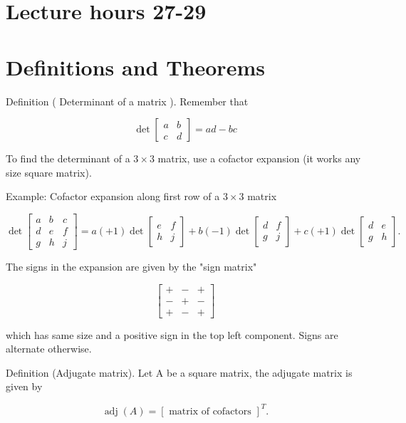 \documentclass[10pt]{article}
\begin{document}
\section*{Lecture hours 27-29}
\section*{Definitions and Theorems}
Definition ( Determinant of a matrix ). Remember that

$$
\operatorname{det}\left[\begin{array}{ll}
a & b \\
c & d
\end{array}\right]=a d-b c
$$

To find the determinant of a $3 \times 3$ matrix, use a cofactor expansion (it works any size square matrix).

Example: Cofactor expansion along first row of a $3 \times 3$ matrix

$$
\operatorname{det}\left[\begin{array}{lll}
a & b & c \\
d & e & f \\
g & h & j
\end{array}\right]=a(+1) \operatorname{det}\left[\begin{array}{ll}
e & f \\
h & j
\end{array}\right]+b(-1) \operatorname{det}\left[\begin{array}{ll}
d & f \\
g & j
\end{array}\right]+c(+1) \operatorname{det}\left[\begin{array}{ll}
d & e \\
g & h
\end{array}\right] .
$$

The signs in the expansion are given by the "sign matrix"

$$
\left[\begin{array}{ccc}
+ & - & + \\
- & + & - \\
+ & - & +
\end{array}\right]
$$

which has same size and a positive sign in the top left component. Signs are alternate otherwise.

Definition (Adjugate matrix). Let A be a square matrix, the adjugate matrix is given by

$$
\operatorname{adj}(A)=[\text { matrix of cofactors }]^{T} .
$$
\end{document}
